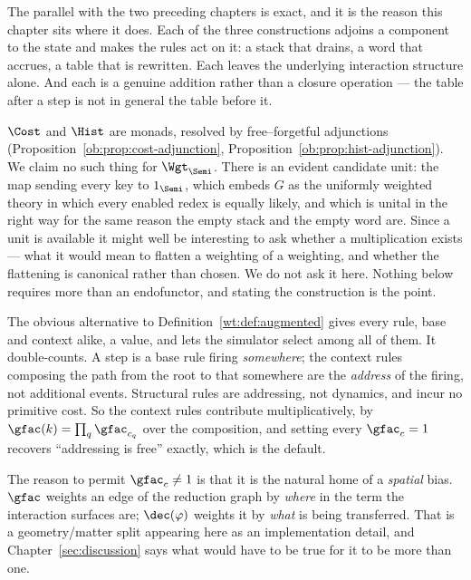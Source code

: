 The parallel with the two preceding chapters is exact, and it is the reason this chapter
sits where it does. Each of the three constructions adjoins a component to the state and
makes the rules act on it: a stack that drains, a word that accrues, a table that is
rewritten. Each leaves the underlying interaction structure alone. And each is a genuine
addition rather than a closure operation --- the table after a step is not in general the
table before it.

\begin{remark}
\label{wt:rmk:notamonad}
$\Cost$ and $\Hist$ are monads, resolved by free--forgetful adjunctions
(Proposition~\ref{ob:prop:cost-adjunction}, Proposition~\ref{ob:prop:hist-adjunction}).
We claim no such thing for $\Wgt_{\Semi}$. There is an evident candidate unit: the map
sending every key to $1_{\Semi}$, which embeds $G$ as the uniformly weighted theory in
which every enabled redex is equally likely, and which is unital in the right way for the
same reason the empty stack and the empty word are. Since a unit is available it might
well be interesting to ask whether a multiplication exists --- what it would mean to
flatten a weighting of a weighting, and whether the flattening is canonical rather than
chosen. We do not ask it here. Nothing below requires more than an endofunctor, and
stating the construction is the point.
\end{remark}

\begin{remark}
\label{wt:rmk:geometric}
The obvious alternative to Definition~\ref{wt:def:augmented} gives every rule, base and
context alike, a value, and lets the simulator select among all of them. It
double-counts. A step is a base rule firing \emph{somewhere}; the context rules composing
the path from the root to that somewhere are the \emph{address} of the firing, not
additional events. Structural rules are addressing, not dynamics, and incur no primitive
cost. So the context rules contribute multiplicatively, by
$\gfac(k) = \prod_q \gfac_{c_q}$ over the composition, and setting every $\gfac_c = 1$
recovers ``addressing is free'' exactly, which is the default.

The reason to permit $\gfac_c \neq 1$ is that it is the natural home of a \emph{spatial}
bias. $\gfac$ weights an edge of the reduction graph by \emph{where} in the term the
interaction surfaces are; $\dec(\varphi)$ weights it by \emph{what} is being transferred.
That is a geometry/matter split appearing here as an implementation detail, and
Chapter~\ref{sec:discussion} says what would have to be true for it to be more than one.
\end{remark}

